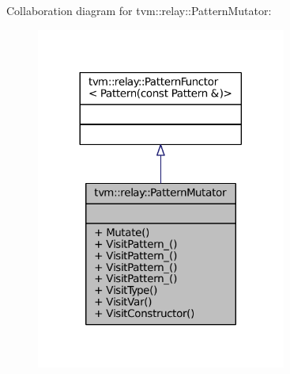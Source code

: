 Collaboration diagram for tvm\+:\+:relay\+:\+:Pattern\+Mutator\+:
\nopagebreak
\begin{figure}[H]
\begin{center}
\leavevmode
\includegraphics[width=233pt]{classtvm_1_1relay_1_1PatternMutator__coll__graph}
\end{center}
\end{figure}
